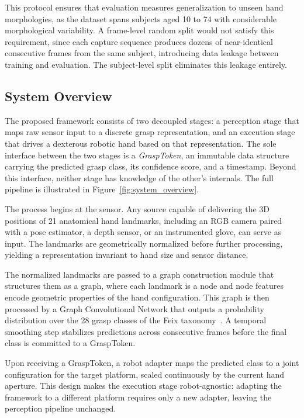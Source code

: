 \documentclass[letterpaper, 10 pt, conference]{ieeeconf}  %
\begin{document}
This protocol ensures that evaluation measures generalization to unseen hand morphologies, as the dataset spans subjects aged 10 to 74 with considerable morphological variability. A frame-level random split would not satisfy this requirement, since each capture sequence produces dozens of near-identical consecutive frames from the same subject, introducing data leakage between training and evaluation. The subject-level split eliminates this leakage entirely.

\subsection{System Overview}

The proposed framework consists of two decoupled stages: a perception stage that maps raw sensor input to a discrete grasp representation, and an execution stage that drives a dexterous robotic hand based on that representation. The sole interface between the two stages is a \textit{GraspToken}, an immutable data structure carrying the predicted grasp class, its confidence score, and a timestamp. Beyond this interface, neither stage has knowledge of the other's internals. The full pipeline is illustrated in Figure~\ref{fig:system_overview}.

The process begins at the sensor. Any source capable of delivering the 3D positions of 21 anatomical hand landmarks, including an RGB camera paired with a pose estimator, a depth sensor, or an instrumented glove, can serve as input. The landmarks are geometrically normalized before further processing, yielding a representation invariant to hand size and sensor distance.

The normalized landmarks are passed to a graph construction module that structures them as a graph, where each landmark is a node and node features encode geometric properties of the hand configuration. This graph is then processed by a Graph Convolutional Network that outputs a probability distribution over the 28 grasp classes of the Feix taxonomy~\cite{feix_grasptax2016}. A temporal smoothing step stabilizes predictions across consecutive frames before the final class is committed to a GraspToken.

Upon receiving a GraspToken, a robot adapter maps the predicted class to a joint configuration for the target platform, scaled continuously by the current hand aperture. This design makes the execution stage robot-agnostic: adapting the framework to a different platform requires only a new adapter, leaving the perception pipeline unchanged.
\end{document}
